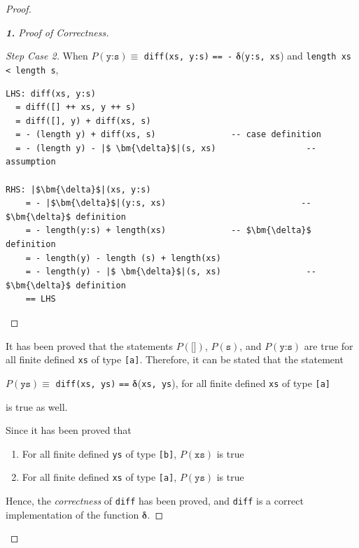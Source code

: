 \documentclass[12pt]{article}
\newcommand{\haskell}{\texttt}
\begin{document}
\begin{proof}
\begin{proof}[\textbf{1.} Proof of Correctness]
\begin{proof}[Step Case 2]
When $P(\haskell{y:s}) \equiv$ \haskell{diff(xs, y:s)} \haskell{== -} $\bm{\delta}$(\haskell{y:s, xs}) and \haskell{length xs < length s},
\begin{mdframed}
\begin{verbatim}
LHS: diff(xs, y:s)
  = diff([] ++ xs, y ++ s)
  = diff([], y) + diff(xs, s)
  = - (length y) + diff(xs, s)               -- case definition
  = - (length y) - |$ \bm{\delta}$|(s, xs)                  -- assumption

RHS: |$\bm{\delta}$|(xs, y:s)
    = - |$\bm{\delta}$|(y:s, xs)                           -- $\bm{\delta}$ definition
    = - length(y:s) + length(xs)             -- $\bm{\delta}$ definition
    = - length(y) - length (s) + length(xs)
    = - length(y) - |$ \bm{\delta}$|(s, xs)                 -- $\bm{\delta}$ definition
    == LHS
\end{verbatim}
\end{mdframed}
\end{proof}
It has been proved that the statements $P(\haskell{[]})$, $P(\haskell{s})$, and $P(\haskell{y:s})$ are true for all finite defined \haskell{xs} of type \haskell{[a]}. Therefore, it can be stated that the statement
\begin{center}
    $P(\haskell{ys}) \equiv$ \haskell{diff(xs, ys)} \haskell{==} $\bm{\delta}$(\haskell{xs, ys}), for all finite defined \haskell{xs} of type \haskell{[a]}
\end{center}
is true as well.

\noindent Since it has been proved that 
\begin{enumerate}
    \item For all finite defined \haskell{ys} of type \haskell{[b]}, $P(\haskell{xs})$ is true
    \item For all finite defined \haskell{xs} of type \haskell{[a]}, $P(\haskell{ys})$ is true
\end{enumerate}
Hence, the \emph{correctness} of \haskell{diff} has been proved, and \haskell{diff} is a correct implementation of the function $\bm{\delta}$.
\end{proof}


\end{proof}
\end{document}
